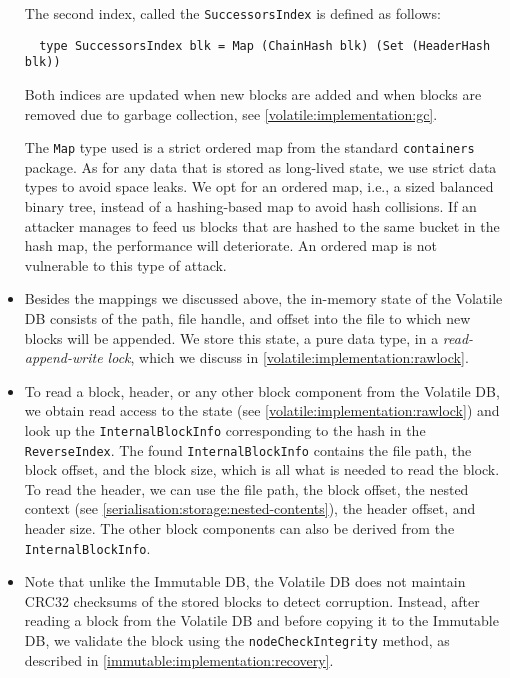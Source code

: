 \begin{itemize}
  The second index, called the \lstinline!SuccessorsIndex! is defined as
  follows:
  \begin{lstlisting}
  type SuccessorsIndex blk = Map (ChainHash blk) (Set (HeaderHash blk))
  \end{lstlisting}

  Both indices are updated when new blocks are added and when blocks are removed
  due to garbage collection, see \cref{volatile:implementation:gc}.

  The \lstinline!Map! type used is a strict ordered map from the standard
  \lstinline!containers! package. As for any data that is stored as long-lived
  state, we use strict data types to avoid space leaks. We opt for an ordered
  map, i.e., a sized balanced binary tree, instead of a hashing-based map to
  avoid hash collisions. If an attacker manages to feed us blocks that are
  hashed to the same bucket in the hash map, the performance will deteriorate.
  An ordered map is not vulnerable to this type of attack.

\item Besides the mappings we discussed above, the in-memory state of the
  Volatile DB consists of the path, file handle, and offset into the file to
  which new blocks will be appended. We store this state, a pure data type, in a
  \emph{read-append-write lock}, which we discuss in
  \cref{volatile:implementation:rawlock}.

\item To read a block, header, or any other block component from the Volatile
  DB, we obtain read access to the state (see
  \cref{volatile:implementation:rawlock}) and look up the
  \lstinline!InternalBlockInfo! corresponding to the hash in the
  \lstinline!ReverseIndex!. The found \lstinline!InternalBlockInfo! contains the
  file path, the block offset, and the block size, which is all what is needed
  to read the block. To read the header, we can use the file path, the block
  offset, the nested context (see \cref{serialisation:storage:nested-contents}),
  the header offset, and header size. The other block components can also be
  derived from the \lstinline!InternalBlockInfo!.

\item Note that unlike the Immutable DB, the Volatile DB does not maintain CRC32
  checksums of the stored blocks to detect corruption. Instead, after reading a
  block from the Volatile DB and before copying it to the Immutable DB, we
  validate the block using the \lstinline!nodeCheckIntegrity! method, as
  described in \cref{immutable:implementation:recovery}.

\end{itemize}

